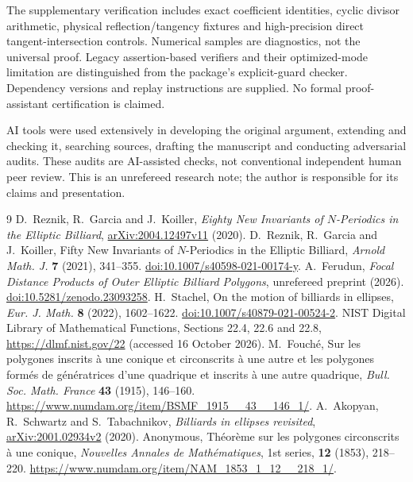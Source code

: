 \documentclass[11pt]{article}
\begin{document}
The supplementary verification includes exact coefficient identities,
cyclic divisor arithmetic, physical reflection/tangency fixtures and
high-precision direct tangent-intersection controls. Numerical samples
are diagnostics, not the universal proof. Legacy assertion-based
verifiers and their optimized-mode limitation are distinguished from
the package's explicit-guard checker. Dependency versions and replay
instructions are supplied. No formal proof-assistant certification is
claimed.

AI tools were used extensively in developing the original argument,
extending and checking it, searching sources, drafting the manuscript
and conducting adversarial audits. These audits are AI-assisted checks,
not conventional independent human peer review. This is an unrefereed
research note; the author is responsible for its claims and presentation.

\begin{thebibliography}{9}
 D.~Reznik, R.~Garcia and J.~Koiller,
\emph{Eighty New Invariants of $N$-Periodics in the Elliptic Billiard},
\href{https://arxiv.org/abs/2004.12497v11}{arXiv:2004.12497v11} (2020).
 D.~Reznik, R.~Garcia and J.~Koiller,
Fifty New Invariants of $N$-Periodics in the Elliptic Billiard,
\emph{Arnold Math. J.} \textbf{7} (2021), 341--355.
\href{https://doi.org/10.1007/s40598-021-00174-y}{doi:10.1007/s40598-021-00174-y}.
 A.~Ferudun,
\emph{Focal Distance Products of Outer Elliptic Billiard Polygons},
unrefereed preprint (2026).
\href{https://doi.org/10.5281/zenodo.23093258}{doi:10.5281/zenodo.23093258}.
 H.~Stachel, On the motion of billiards in ellipses,
\emph{Eur. J. Math.} \textbf{8} (2022), 1602--1622.
\href{https://doi.org/10.1007/s40879-021-00524-2}{doi:10.1007/s40879-021-00524-2}.
 NIST Digital Library of Mathematical Functions,
Sections 22.4, 22.6 and 22.8,
\url{https://dlmf.nist.gov/22} (accessed 16 October 2026).
 M.~Fouch\'e, Sur les polygones inscrits \`a une conique
et circonscrits \`a une autre et les polygones form\'es de g\'en\'eratrices
d'une quadrique et inscrits \`a une autre quadrique,
\emph{Bull. Soc. Math. France} \textbf{43} (1915), 146--160.
\url{https://www.numdam.org/item/BSMF_1915__43__146_1/}.
 A.~Akopyan, R.~Schwartz and S.~Tabachnikov,
\emph{Billiards in ellipses revisited},
\href{https://arxiv.org/abs/2001.02934v2}{arXiv:2001.02934v2} (2020).
 Anonymous, Th\'eor\`eme sur les polygones
circonscrits \`a une conique, \emph{Nouvelles Annales de Math\'ematiques},
1st series, \textbf{12} (1853), 218--220.
\url{https://www.numdam.org/item/NAM_1853_1_12__218_1/}.
\end{thebibliography}
\end{document}
